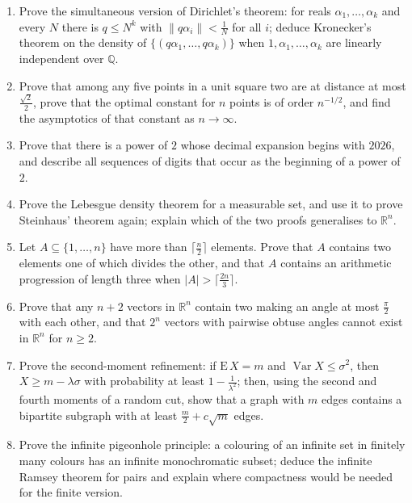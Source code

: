 \documentclass[11pt,a4paper]{article}
\renewcommand{\le}{\leqslant}
\renewcommand{\ge}{\geqslant}
\begin{document}
\begin{enumerate}[leftmargin=2.2em,itemsep=0.6em]
\item Prove the simultaneous version of Dirichlet's theorem: for reals $\alpha_1,\dots,\alpha_k$
and every $N$ there is $q\le N^k$ with $\|q\alpha_i\|<\frac1N$ for all $i$; deduce Kronecker's
theorem on the density of $\{(q\alpha_1,\dots,q\alpha_k)\}$ when $1,\alpha_1,\dots,\alpha_k$
are linearly independent over $\mathbb Q$.

\item Prove that among any five points in a unit square two are at distance at most
$\frac{\sqrt2}{2}$, prove that the optimal constant for $n$ points is of order $n^{-1/2}$, and
find the asymptotics of that constant as $n\to\infty$.

\item Prove that there is a power of $2$ whose decimal expansion begins with $2026$, and
describe all sequences of digits that occur as the beginning of a power of $2$.

\item Prove the Lebesgue density theorem for a measurable set, and use it to prove Steinhaus'
theorem again; explain which of the two proofs generalises to $\mathbb R^n$.

\item Let $A\subseteq\{1,\dots,n\}$ have more than $\lceil\frac n2\rceil$ elements. Prove that
$A$ contains two elements one of which divides the other, and that $A$ contains an arithmetic
progression of length three when $|A|>\lceil\frac{2n}3\rceil$.

\item Prove that any $n+2$ vectors in $\mathbb R^n$ contain two making an angle at most
$\frac\pi2$ with each other, and that $2^n$ vectors with pairwise obtuse angles cannot exist in
$\mathbb R^n$ for $n\ge2$.

\item Prove the second-moment refinement: if $\mathrm E\,X=m$ and $\operatorname{Var}X\le\sigma^2$,
then $X\ge m-\lambda\sigma$ with probability at least $1-\frac1{\lambda^2}$; then, using the
second and fourth moments of a random cut, show that a graph with $m$ edges contains a
bipartite subgraph with at least $\frac m2+c\sqrt m$ edges.

\item Prove the infinite pigeonhole principle: a colouring of an infinite set in finitely many
colours has an infinite monochromatic subset; deduce the infinite Ramsey theorem for pairs and
explain where compactness would be needed for the finite version.


\end{enumerate}
\end{document}
